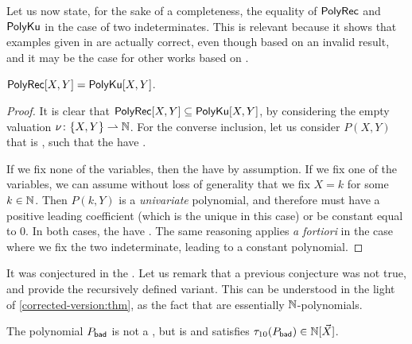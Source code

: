 Let us now state, for the sake of a completeness, the equality of
$\mathsf{PolyRec}$ and $\mathsf{PolyKu}$ in the case of two indeterminates. This is
relevant because it shows that examples given in \cite{KARH77} are actually
correct, even though based on an invalid result, and it may be the case for
other works based on \cite{KARH77}.

\begin{lemma}
    \label{lem:correct-covered-2}
    $\mathsf{PolyRec}[X,Y] = \mathsf{PolyKu}[X,Y]$.
\end{lemma}
\begin{proof}
    It is clear that $\mathsf{PolyRec}[X,Y] \subseteq \mathsf{PolyKu}[X,Y]$,
    by considering the empty valuation $\nu \colon \mathopen{\{} X,Y \mathclose{\}} \rightharpoonup \mathbb{N}$.
    For the converse inclusion, let us consider $P(X,Y)$
    that is , such that the 
    have .
   

    If we fix none of the variables, then the 
    have  by assumption. If we fix one of the
    variables, we can assume without loss of generality that we 
    fix $X = k$ for some $k \in \mathbb{N}$.
    Then $P(k,Y)$ is a  \emph{univariate} polynomial, 
    and therefore must have a positive leading coefficient
    (which is the unique  in this case)
    or be constant equal to 0. In both cases, the 
    have .
    The same reasoning applies \emph{a fortiori} in the case where
    we fix the two indeterminate, leading to a constant polynomial.
\end{proof}


It was conjectured in the 
\cite[Open question 5.55]{gaetanphd}.
\cite[Conjecture 7.61]{gaetanphd}
Let us remark that a previous conjecture was not true, and provide the
recursively defined variant. This can be understood in the light of
\cref{corrected-version:thm}, as the fact that 
are essentially $\mathbb{N}$-polynomials.

\begin{example}
    The polynomial $P_{\mathsf{bad}}$ is not a 
    ,
    but is  and satisfies
    $\tau_{10}(P_{\mathsf{bad}}) \in \mathbb{N}[\vec{X}]$.
\end{example}

